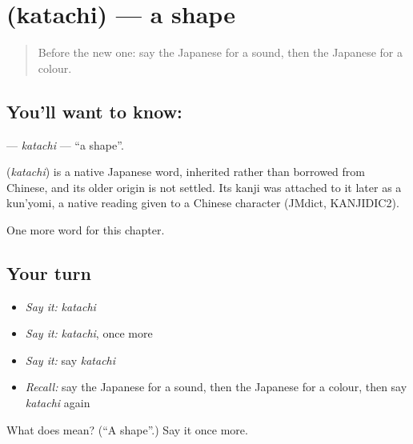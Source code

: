 \section[\texorpdfstring{\ja{かたち} (katachi)}{かたち (katachi)}]{ (katachi) — a shape}

\label{lesson:JA-C62-katachi}



\begin{quote}
Before the new one: say the Japanese for a sound, then the Japanese for a colour.
\end{quote}

\subsection*{You'll want to know: }
\textbf{} — \emph{katachi} — \textquotedblleft{}a shape\textquotedblright{}.

\begin{cousinweb}
\textbf{} (\emph{katachi}) is a native Japanese word, inherited rather than borrowed from Chinese, and its older origin is not settled. Its kanji was attached to it later as a kun'yomi, a native reading given to a Chinese character (JMdict, KANJIDIC2).
\end{cousinweb}

\begin{grammarlens}[title={What you've built}]
One more word for this chapter.
\end{grammarlens}

\subsection*{Your turn}
\begin{itemize}
\raggedright
  \item \emph{Say it:} \emph{katachi}
  \item \emph{Say it:} \emph{katachi}, once more
  \item \emph{Say it:} say \emph{katachi}
  \item \emph{Recall:} say the Japanese for a sound, then the Japanese for a colour, then say \emph{katachi} again
\end{itemize}

\begin{tcolorbox}[breakable,colback=teal!4,colframe=teal!35!black,title={Before you move on}]
What does  mean? (\textquotedblleft{}A shape\textquotedblright{}.) Say it once more.
\end{tcolorbox}
